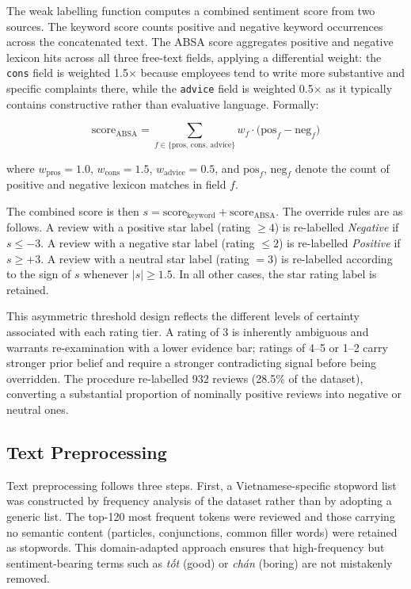 \documentclass[12pt, a4paper]{article}
\begin{document}
The weak labelling function computes a combined sentiment score from two sources. The keyword score counts positive and negative keyword occurrences across the concatenated text. The ABSA score aggregates positive and negative lexicon hits across all three free-text fields, applying a differential weight: the \texttt{cons} field is weighted 1.5$\times$ because employees tend to write more substantive and specific complaints there, while the \texttt{advice} field is weighted 0.5$\times$ as it typically contains constructive rather than evaluative language. Formally:

\[
\text{score}_{\text{ABSA}} = \sum_{f \in \{\text{pros, cons, advice}\}} w_f \cdot \bigl(\text{pos}_f - \text{neg}_f\bigr)
\]

where $w_{\text{pros}} = 1.0$, $w_{\text{cons}} = 1.5$, $w_{\text{advice}} = 0.5$, and $\text{pos}_f$, $\text{neg}_f$ denote the count of positive and negative lexicon matches in field $f$.

The combined score is then $s = \text{score}_{\text{keyword}} + \text{score}_{\text{ABSA}}$. The override rules are as follows. A review with a positive star label (rating $\geq 4$) is re-labelled \textit{Negative} if $s \leq -3$. A review with a negative star label (rating $\leq 2$) is re-labelled \textit{Positive} if $s \geq +3$. A review with a neutral star label (rating $= 3$) is re-labelled according to the sign of $s$ whenever $|s| \geq 1.5$. In all other cases, the star rating label is retained.

This asymmetric threshold design reflects the different levels of certainty associated with each rating tier. A rating of 3 is inherently ambiguous and warrants re-examination with a lower evidence bar; ratings of 4--5 or 1--2 carry stronger prior belief and require a stronger contradicting signal before being overridden. The procedure re-labelled 932 reviews (28.5\% of the dataset), converting a substantial proportion of nominally positive reviews into negative or neutral ones.

\subsection{Text Preprocessing}

Text preprocessing follows three steps. First, a Vietnamese-specific stopword list was constructed by frequency analysis of the dataset rather than by adopting a generic list. The top-120 most frequent tokens were reviewed and those carrying no semantic content (particles, conjunctions, common filler words) were retained as stopwords. This domain-adapted approach ensures that high-frequency but sentiment-bearing terms such as \textit{tốt} (good) or \textit{chán} (boring) are not mistakenly removed.
\end{document}
